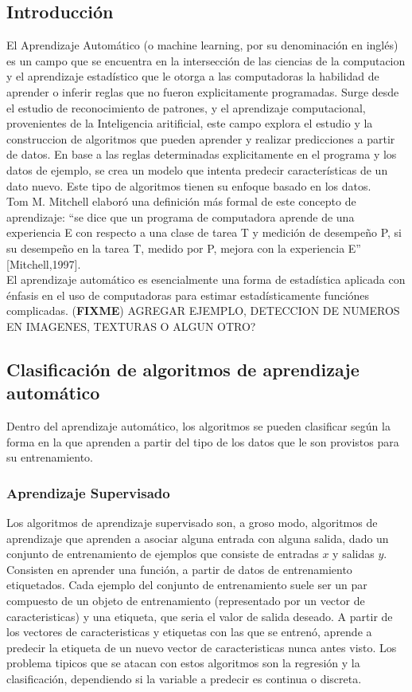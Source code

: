 \documentclass[a4paper,11pt,spanish]{book}
\newcommand*{\FIXME}[1]{{(\textbf{FIXME}) {#1}}}
\begin{document}
    \subsection{Introducción}
      El Aprendizaje Automático (o machine learning, por su denominación en
      inglés) es un campo que se encuentra en la intersección de las ciencias de la computacion y el aprendizaje estadístico que le otorga a las computadoras la habilidad de aprender o inferir reglas que no fueron explicitamente programadas.
      Surge desde el estudio de reconocimiento de patrones, y el aprendizaje computacional, provenientes de la Inteligencia aritificial, este campo explora el estudio y la construccion de algoritmos
      que pueden aprender y realizar predicciones a partir de datos. En base a las reglas determinadas explicitamente en el programa y los datos de ejemplo, se crea un modelo que intenta predecir
      características de un dato nuevo. Este tipo de algoritmos tienen su enfoque basado en los datos.\\
      Tom M. Mitchell elaboró una definición más formal de este concepto de aprendizaje: “se dice que un programa de computadora aprende de una experiencia E con respecto a una clase
      de tarea T y medición de desempeño P, si su desempeño en la tarea T, medido por P, mejora con la experiencia E” [Mitchell,1997].\\
      El aprendizaje automático es esencialmente una forma de estadística aplicada con énfasis en el uso de computadoras para estimar estadísticamente funciónes complicadas.
      \FIXME{AGREGAR EJEMPLO, DETECCION DE NUMEROS EN IMAGENES, TEXTURAS O ALGUN OTRO?}

    \subsection{Clasificación de algoritmos de aprendizaje automático}
      Dentro del aprendizaje automático, los algoritmos se pueden clasificar
      según la forma en la que aprenden a partir del tipo de los datos que le son provistos para su entrenamiento.

      \subsubsection{Aprendizaje Supervisado}
	Los algoritmos de aprendizaje supervisado son, a groso modo, algoritmos de aprendizaje que aprenden a asociar alguna entrada con alguna salida,
	dado un conjunto de entrenamiento de ejemplos que consiste de entradas $x$ y salidas $y$.
	Consisten en aprender una función, a partir de datos de entrenamiento etiquetados. Cada ejemplo del conjunto de entrenamiento suele ser un par
	compuesto de un objeto de entrenamiento (representado por un vector de caracteristicas) y una etiqueta, que seria el valor de salida deseado.
	A partir de los vectores de caracteristicas y etiquetas con las que se entrenó, aprende a predecir la etiqueta de un nuevo vector de caracteristicas nunca antes visto.
	Los problema tipicos que se atacan con estos algoritmos son la regresión y la clasificación, dependiendo si la variable a predecir es continua o discreta.
	
\end{document}
